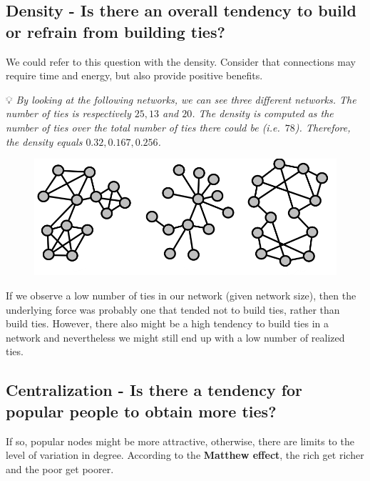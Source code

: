 \documentclass[
  notitlepage,
  onecolumn,
  openany]{book}
\begin{document}
\hypertarget{density---is-there-an-overall-tendency-to-build-or-refrain-from-building-ties}{%
\subsection{Density - Is there an overall tendency to build or refrain from building ties?}\label{density---is-there-an-overall-tendency-to-build-or-refrain-from-building-ties}}

We could refer to this question with the density. Consider that connections may require time and energy, but also provide positive benefits.

💡 \emph{By looking at the following networks, we can see three different networks. The number of ties is respectively \(25, 13\) and \(20\). The density is computed as the number of ties over the total number of ties there could be (i.e.~\(78\)). Therefore, the density equals \(0.32, 0.167, 0.256\).}

\begin{figure}[h!]

{\centering \includegraphics[width=0.5\linewidth]{images/13-ERGMs/Untitled} 

}

\end{figure}

If we observe a low number of ties in our network (given network size), then the underlying force was probably one that tended not to build ties, rather than build ties. However, there also might be a high tendency to build ties in a network and nevertheless we might still end up with a low number of realized ties.

\hypertarget{centralization---is-there-a-tendency-for-popular-people-to-obtain-more-ties}{%
\subsection{Centralization - Is there a tendency for popular people to obtain more ties?}\label{centralization---is-there-a-tendency-for-popular-people-to-obtain-more-ties}}

If so, popular nodes might be more attractive, otherwise, there are limits to the level of variation in degree. According to the \textbf{Matthew effect}, the rich get richer and the poor get poorer.
\end{document}
